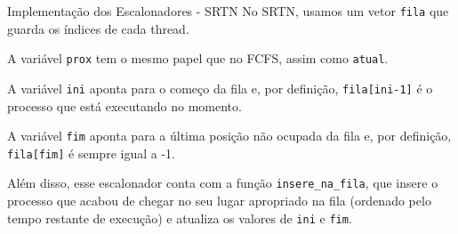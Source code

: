 \documentclass[10pt]{beamer}
\begin{document}
    \begin{frame}{Implementação dos Escalonadores - SRTN}
        No SRTN, usamos um vetor \texttt{fila} que guarda os índices de cada thread.

        A variável \texttt{prox} tem o mesmo papel que no FCFS, assim como
        \texttt{atual}.

        A variável \texttt{ini} aponta para o começo da fila e, por definição,
        \texttt{fila[ini-1]} é o processo que está executando no momento.

        A variável \texttt{fim} aponta para a última posição não ocupada da fila e,
        por definição, \texttt{fila[fim]} é sempre igual a -1.

        Além disso, esse escalonador conta com a função \texttt{insere\_na\_fila}, que
        insere o processo que acabou de chegar no seu lugar apropriado na fila
        (ordenado pelo tempo restante de execução) e atualiza os valores de
        \texttt{ini} e \texttt{fim}.
    \end{frame}
\end{document}
